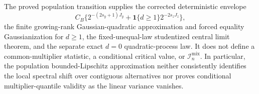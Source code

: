 The proved population transition supplies the corrected deterministic envelope
\[
C_B\{2^{-(2s_y+1)J_y}+\mathbf 1\{d\ge1\}2^{-2s_zJ_z}\},
\]
the finite growing-rank Gaussian-quadratic approximation and forced equality Gaussianization for \(d\ge1\), the fixed-unequal-law studentized central limit theorem, and the separate exact \(d=0\) quadratic-process law.  It does not define a common-multiplier statistic, a conditional critical value, or \(\mathcal I_n^{\mathrm{mix}}\).  In particular, the population bounded-Lipschitz approximation neither consistently identifies the local spectral shift over contiguous alternatives nor proves conditional multiplier-quantile validity as the linear variance vanishes.